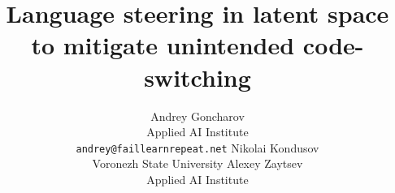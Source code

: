 \documentclass{article}
\begin{document}
\title{Language steering in latent space to mitigate unintended code-switching}

\author{
  Andrey Goncharov\\
  Applied AI Institute\\
  \texttt{andrey@faillearnrepeat.net}
  \And
  Nikolai Kondusov\\
  Voronezh State University
  \And
  Alexey Zaytsev\\
  Applied AI Institute
}

\maketitle





















\appendix

\end{document}
